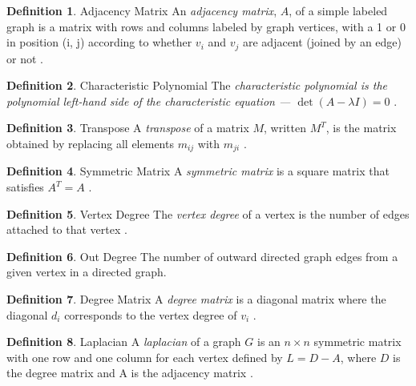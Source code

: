 \documentclass[11pt]{article}
\theoremstyle{definition}
\newtheorem{definition}{Definition}[section]
\begin{document}
	\theoremstyle{definition}
	\begin{definition}{Adjacency Matrix}
		An \emph{adjacency matrix}, $A$, of a simple labeled graph is a matrix with rows and columns labeled by graph vertices, with a 1 or 0 in position (i, j) according to whether $v_i$ and $v_j$ are adjacent (joined by an edge) or not \cite{mathworld:AdjacencyMatrix}. 
	\end{definition}
	
	\theoremstyle{definition}
	\begin{definition}{Characteristic Polynomial}
		The \emph{characteristic polynomial is the polynomial left-hand side of the characteristic equation --- $\det(A - \lambda I) = 0$} \cite{mathworld:CharacteristicPoly}.
	\end{definition}
	
	\theoremstyle{definition}
	\begin{definition}{Transpose}
		A \emph{transpose} of a matrix $M$, written $M^T$, is the matrix obtained by replacing all elements $m_{ij}$ with $m_{ji}$ \cite{mathworld:Transpose}.
	\end{definition}
	
	\theoremstyle{definition}
	\begin{definition}{Symmetric Matrix}
		A \emph{symmetric matrix} is a square matrix that satisfies $A^T = A$ \cite{mathworld:SymmetricMatrix}.
	\end{definition}
	
	\theoremstyle{definition}
	\begin{definition}{Vertex Degree}
		The \emph{vertex degree} of a vertex is the number of edges attached to that vertex \cite{mathworld:VertexDegree}.
	\end{definition}
	
	\theoremstyle{definition}
	\begin{definition}{Out Degree}
		The number of outward directed graph edges from a given vertex in a directed graph.
	\end{definition}
	
	\theoremstyle{definition}
	\begin{definition}{Degree Matrix}
		A \emph{degree matrix} is a diagonal matrix where the diagonal $d_i$ corresponds to the vertex degree of $v_i$ \cite{mathworld:DegreeMatrix}. 
	\end{definition}
	
	\theoremstyle{definition}
	\begin{definition}{Laplacian}
		A \emph{laplacian} of a graph $G$ is an $n \times n$ symmetric matrix with one row and one column for each vertex defined by $L = D - A$, where $D$ is the degree matrix and A is the adjacency matrix \cite{mathworld:Laplacian}.
	\end{definition}
\end{document}
